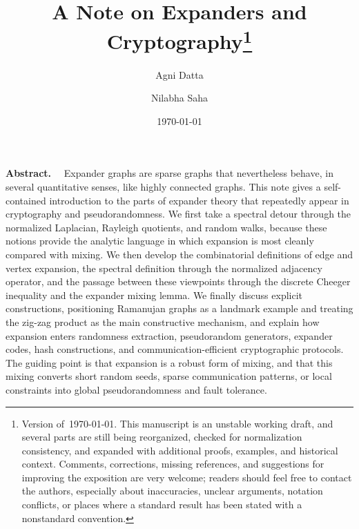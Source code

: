 \documentclass[11pt]{article}
\title{A Note on Expanders and Cryptography\thanks{Version of~\today. This manuscript is an unstable working draft, and several parts are still being reorganized, checked for normalization consistency, and expanded with additional proofs, examples, and historical context. Comments, corrections, missing references, and suggestions for improving the exposition are very welcome; readers should feel free to contact the authors, especially about inaccuracies, unclear arguments, notation conflicts, or places where a standard result has been stated with a nonstandard convention.}}
\author[1]{Agni Datta}
\author[2]{Nilabha Saha}
\affil[1]{University of Edinburgh, UK\authorEmail{agnidatta.org@gmail.com}}
\affil[2]{Hudson River Trading\authorEmail{nilabhasaha13@gmail.com}}
\date{\today}
\renewenvironment{abstract}
    {\small\noindent\textbf{Abstract.}~~\ignorespaces}
    {\par}
\begin{document}

\maketitle


\begin{abstract}
    Expander graphs are sparse graphs that nevertheless behave, in several quantitative senses, like highly connected graphs. This note gives a self-contained introduction to the parts of expander theory that repeatedly appear in cryptography and pseudorandomness. We first take a spectral detour through the normalized Laplacian, Rayleigh quotients, and random walks, because these notions provide the analytic language in which expansion is most cleanly compared with mixing. We then develop the combinatorial definitions of edge and vertex expansion, the spectral definition through the normalized adjacency operator, and the passage between these viewpoints through the discrete Cheeger inequality and the expander mixing lemma. We finally discuss explicit constructions, positioning Ramanujan graphs as a landmark example and treating the zig-zag product as the main constructive mechanism, and explain how expansion enters randomness extraction, pseudorandom generators, expander codes, hash constructions, and communication-efficient cryptographic protocols. The guiding point is that expansion is a robust form of mixing, and that this mixing converts short random seeds, sparse communication patterns, or local constraints into global pseudorandomness and fault tolerance.
\end{abstract}


\clearpage\tableofcontents\clearpage

\end{document}
